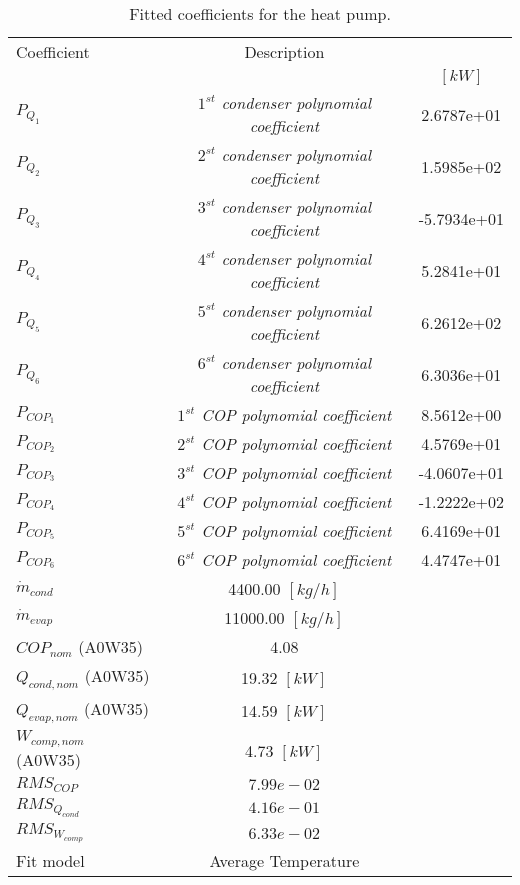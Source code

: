 \documentclass[english]{SPFShortReport}
\author{Dani Carbonell}
\begin{document}
\begin{table}[!ht]
\begin{small}
\caption{Fitted coefficients for the heat pump.}
\begin{center}
\resizebox{12cm}{!} 
{
\begin{tabular}{l | c c } 
\hline
\hline
Coefficient &Description & \\ 
 & &$[kW]$\\ 
\hline
$P_{Q_{1}}$ & \emph{$1^{st}$ condenser polynomial coefficient}  & 2.6787e+01    \\ 
$P_{Q_{2}}$ & \emph{$2^{st}$ condenser polynomial coefficient}  & 1.5985e+02    \\ 
$P_{Q_{3}}$ & \emph{$3^{st}$ condenser polynomial coefficient}  & -5.7934e+01    \\ 
$P_{Q_{4}}$ & \emph{$4^{st}$ condenser polynomial coefficient}  & 5.2841e+01    \\ 
$P_{Q_{5}}$ & \emph{$5^{st}$ condenser polynomial coefficient}  & 6.2612e+02    \\ 
$P_{Q_{6}}$ & \emph{$6^{st}$ condenser polynomial coefficient}  & 6.3036e+01    \\ 
\hline
$P_{COP_{1}}$ & \emph{$1^{st}$ COP polynomial coefficient}  & 8.5612e+00    \\ 
$P_{COP_{2}}$ & \emph{$2^{st}$ COP polynomial coefficient}  & 4.5769e+01    \\ 
$P_{COP_{3}}$ & \emph{$3^{st}$ COP polynomial coefficient}  & -4.0607e+01    \\ 
$P_{COP_{4}}$ & \emph{$4^{st}$ COP polynomial coefficient}  & -1.2222e+02    \\ 
$P_{COP_{5}}$ & \emph{$5^{st}$ COP polynomial coefficient}  & 6.4169e+01    \\ 
$P_{COP_{6}}$ & \emph{$6^{st}$ COP polynomial coefficient}  & 4.4747e+01    \\ 
\hline
$\dot m_{cond}$ & 4400.00 $[kg/h]$ \\ 
$\dot m_{evap}$ & 11000.00 $[kg/h]$ \\ 
\hline
$COP_{nom}$ (A0W35)& 4.08 \\ 
$Q_{cond,nom}$ (A0W35)& 19.32 $[kW]$\\ 
$Q_{evap,nom}$ (A0W35)& 14.59 $[kW]$\\ 
$W_{comp,nom}$ (A0W35)& 4.73 $[kW]$\\ 
\hline
 $RMS_{COP}$ & $7.99e-02$ \\ 
 $RMS_{Q_{cond}}$ & $4.16e-01$ \\ 
 $RMS_{W_{comp}}$ & $6.33e-02$ \\ 
\hline
Fit model & Average Temperature\\ 
\hline
\hline
\end{tabular}
}
\label{CoefTable}
\end{center}
\end{small}
\end{table}
\end{document}
